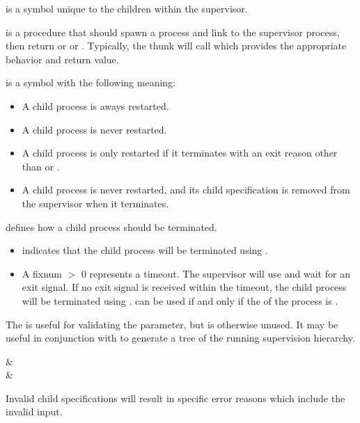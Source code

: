  is a symbol unique to the children within the supervisor.

 is a procedure that should spawn a process and link to the
supervisor process, then return  or
 or . Typically, the
thunk will call  which provides the
appropriate behavior and return value.

 is a symbol with the following meaning:
\antipar
\begin{itemize}
  \item A  child process is aways restarted.
  \item A  child process is never restarted.
  \item A  child process is only restarted if it
    terminates with an exit reason other than  or
    .
  \item A  child process is never restarted, and
    its child specification is removed from the supervisor when it
    terminates.
\end{itemize}

 defines how a child process should be terminated.
\antipar
\begin{itemize}
\item {} indicates that the child process will be
  terminated using .

\item A fixnum $>$ 0 represents a timeout. The supervisor will use
   and wait for an exit signal. If
  no exit signal is received within the timeout, the child process
  will be terminated using .  can be used if and only if the
   of the process is .
\end{itemize}

The  is useful for validating the  parameter,
but is otherwise unused. It may be useful in conjunction with
 to generate a tree of the running
supervision hierarchy.

\begin{grammar}
  & \\
  & 
\end{grammar}

Invalid child specifications will result in specific error reasons
which include the invalid input.

